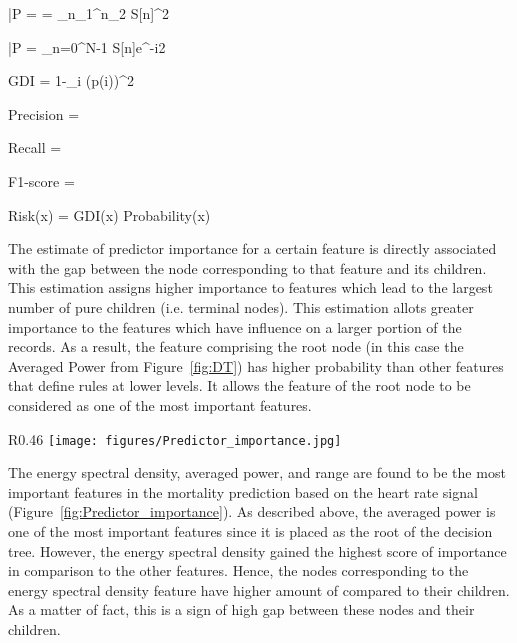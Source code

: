 \documentclass[3p]{elsarticle}
\begin{document}
\label{equ:average_power}
\bar{P} =  =  \sum_{n_1}^{n_2} S[n]^2

\label{equ:psd}
\bar{P} =  \mid \sum_{n=0}^{N-1} S[n]e^{-i2\pi\rho} \mid

\label{equ:gdi}
GDI = 1-\sum_{i} (p(i))^{2}

\label{equ:pre}
Precision = 

\label{equ:rec}
Recall = 

\label{equ:f1}
F1-score = 

\label{equ:risk}
Risk(x) = GDI(x) \times Probability(x)


The estimate of predictor importance for a certain feature is directly associated with the  gap between the node corresponding to that feature and its children. This estimation assigns higher importance to features which lead to the largest number of pure children (i.e. terminal nodes). This estimation allots greater importance to the features which have influence on a larger portion of the records. As a result, the feature comprising the root node (in this case the Averaged Power from Figure~\ref{fig:DT}) has higher probability than other features that define rules at lower levels. It allows the feature of the root node to be considered as one of the most important features.

\begin{wrapfigure}{R}{0.46\textwidth}
\centering
\texttt{[image: figures/Predictor\_importance.jpg]}
\caption{Feature importance in the proposed model for mortality prediction based on heart rate signal}
\label{fig:Predictor_importance}
\end{wrapfigure}

The energy spectral density, averaged power, and range are found to be the most important features in the mortality prediction based on the heart rate signal (Figure~\ref{fig:Predictor_importance}). As described above, the averaged power is one of the most important features since it is placed as the root of the decision tree. However, the energy spectral density gained the highest score of importance in comparison to the other features. Hence, the nodes corresponding to the energy spectral density feature have higher amount of  compared to their children. As a matter of fact, this is a sign of high  gap between these nodes and their children.
\end{document}
